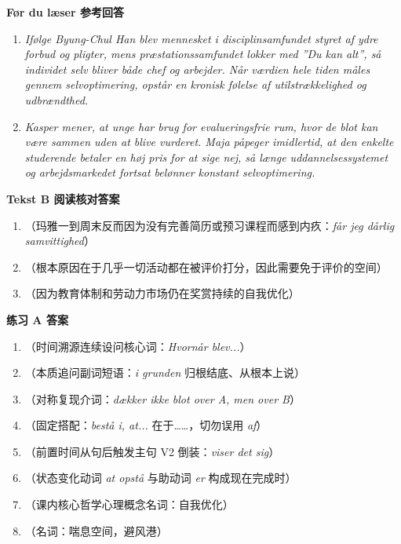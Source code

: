 \begin{answerbox}
\textbf{Før du læser 参考回答}
\begin{enumerate}
  \item \textit{Ifølge Byung-Chul Han blev mennesket i disciplinsamfundet styret af ydre forbud og pligter, mens præstationssamfundet lokker med ”Du kan alt”, så individet selv bliver både chef og arbejder. Når værdien hele tiden måles gennem selvoptimering, opstår en kronisk følelse af utilstrækkelighed og udbrændthed.}
  \item \textit{Kasper mener, at unge har brug for evalueringsfrie rum, hvor de blot kan være sammen uden at blive vurderet. Maja påpeger imidlertid, at den enkelte studerende betaler en høj pris for at sige nej, så længe uddannelsessystemet og arbejdsmarkedet fortsat belønner konstant selvoptimering.}
\end{enumerate}

\textbf{Tekst B 阅读核对答案}
\begin{enumerate}
  \item {}（玛雅一到周末反而因为没有完善简历或预习课程而感到内疚：\textit{får jeg dårlig samvittighed}）
  \item {}（根本原因在于几乎一切活动都在被评价打分，因此需要免于评价的空间）
  \item {}（因为教育体制和劳动力市场仍在奖赏持续的自我优化）
\end{enumerate}

\textbf{练习 A 答案}
\begin{enumerate}
  \item {}（时间溯源连续设问核心词：\textit{Hvornår blev...}）
  \item {}（本质追问副词短语：\textit{i grunden} 归根结底、从根本上说）
  \item {}（对称复现介词：\textit{dækker ikke blot over A, men over B}）
  \item {}（固定搭配：\textit{bestå i, at...} 在于……，切勿误用 \textit{af}）
  \item {}（前置时间从句后触发主句 V2 倒装：\textit{viser det sig}）
  \item {}（状态变化动词 \textit{at opstå} 与助动词 \textit{er} 构成现在完成时）
  \item {}（课内核心哲学心理概念名词：自我优化）
  \item {}（名词：喘息空间，避风港）
\end{enumerate}


\end{answerbox}
